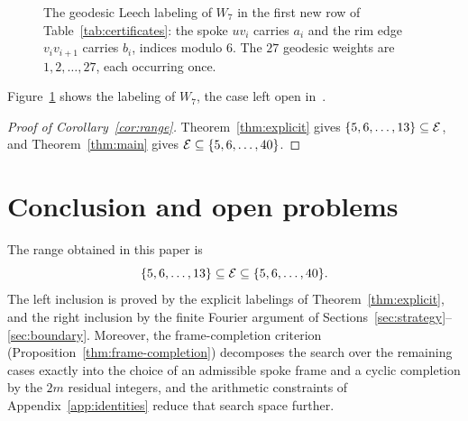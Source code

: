 \documentclass[11pt]{article}
\theoremstyle{definition}
\theoremstyle{remark}
\numberwithin{equation}{section}
\newcommand{\calE}{\mathcal{E}}
\DeclarePairedDelimiter{\set}{\{}{\}}
\begin{document}
\begin{figure}[ht]
\centering
{}
\caption{The geodesic Leech labeling of $W_7$ in the first new row of
Table~\ref{tab:certificates}: the spoke $uv_i$ carries $a_i$ and the rim edge
$v_iv_{i+1}$ carries $b_i$, indices modulo $6$. The $27$ geodesic weights are
$1,2,\ldots,27$, each occurring once.}\label{fig:w7}
\end{figure}

Figure~\ref{fig:w7} shows the labeling of $W_7$, the case left open in~\cite[Figure~4]{LakshmananManattu2025}.

\begin{proof}[Proof of Corollary~\ref{cor:range}]
Theorem~\ref{thm:explicit} gives $\set{5,6,\ldots,13}\subseteq\calE$, and
Theorem~\ref{thm:main} gives $\calE\subseteq\set{5,6,\ldots,40}$.
\end{proof}


\section{Conclusion and open problems}\label{sec:conclusion}

The range obtained in this paper is
\[
  \set{5,6,\ldots,13}\subseteq\calE
  \subseteq\set{5,6,\ldots,40}.
\]
The left inclusion is proved by the explicit labelings of Theorem~\ref{thm:explicit}, and the right inclusion by the finite Fourier argument of Sections~\ref{sec:strategy}--\ref{sec:boundary}. Moreover, the frame-completion criterion (Proposition~\ref{thm:frame-completion}) decomposes the search over the remaining cases exactly into the choice of an admissible spoke frame and a cyclic completion by the $2m$ residual integers, and the arithmetic constraints of Appendix~\ref{app:identities} reduce that search space further.
\end{document}
